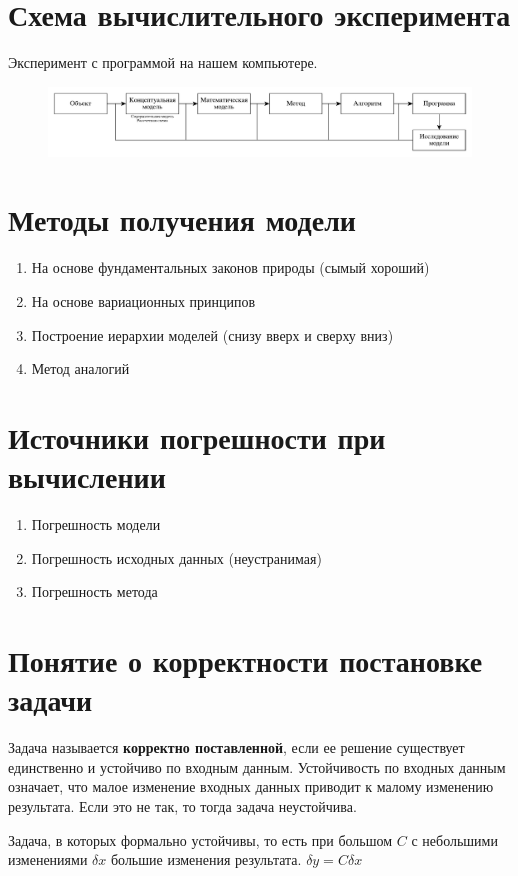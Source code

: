 \section{Схема вычислительного эксперимента}

Эксперимент с программой на нашем компьютере.

\begin{figure}[H]
    \centering
    \includegraphics[scale=0.5]{img/schema.pdf}
\end{figure}

\section{Методы получения модели}

\begin{enumerate}
    \item На основе фундаментальных законов природы (сымый хороший)
    \item На основе вариационных принципов
    \item Построение иерархии моделей (снизу вверх и сверху вниз)
    \item Метод аналогий
\end{enumerate}

\section{Источники погрешности при вычислении}

\begin{enumerate}
    \item Погрешность модели
    \item Погрешность исходных данных (неустранимая)
    \item Погрешность метода
\end{enumerate}

\section{Понятие о корректности постановке задачи}

Задача называется \textbf{корректно поставленной}, если ее
решение существует единственно и устойчиво по входным данным.
Устойчивость по входных данным  означает, что малое изменение
входных данных приводит к малому изменению результата.
Если это не так, то тогда задача неустойчива.

Задача, в которых формально устойчивы, то есть при большом $C$
с небольшими изменениями $\delta x$ большие изменения результата.
$\delta y = C \delta x$
